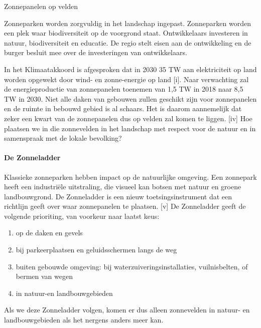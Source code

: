 \begin{voorstel}{Zonnepanelen op velden}


\begin{samenvatting}
Zonneparken worden zorgvuldig in het landschap ingepast. Zonneparken worden een plek waar biodiversiteit op de voorgrond staat. Ontwikkelaars investeren in natuur, biodiversiteit en educatie. De regio stelt eisen aan de ontwikkeling en de burger besluit mee over de investeringen van ontwikkelaars.
\end{samenvatting}

\begin{multicols}{2}

\begin{uitdaging}
In het Klimaatakkoord is afgesproken dat in 2030 35 TW aan elektriciteit op land worden opgewekt door wind- en zonne-energie op land [i]. Naar verwachting zal de energieproductie van zonnepanelen toenemen van 1,5 TW in 2018 naar 8,5 TW in 2030. Niet alle daken van gebouwen zullen geschikt zijn voor zonnepanelen en de ruimte in bebouwd gebied is al schaars. Het is daarom aannemelijk dat zeker een kwart van de zonnepanelen dus op velden zal komen te liggen. [iv] Hoe plaatsen we in die zonnevelden in het landschap met respect voor de natuur en in samenspraak met de lokale bevolking?
\end{uitdaging}

\begin{overwegingen}
\paragraph{De Zonneladder}
Klassieke zonneparken hebben impact op de natuurlijke omgeving. Een zonnepark heeft een industriële uitstraling, die visueel kan botsen met natuur en groene landbouwgrond. De Zonneladder is een nieuw toetsingsinstrument dat een richtlijn geeft over waar zonnepanelen te plaatsen. [v]
De Zonneladder geeft de volgende prioriting, van voorkeur naar laatst keus:
\begin{enumerate}
	\item op de daken en gevels
	\item bij parkeerplaatsen en geluidsschermen langs de weg
	\item buiten gebouwde omgeving: bij waterzuiveringsinstallaties, vuilnisbelten, of bermen van wegen
	\item in natuur-en landbouwgebieden
\end{enumerate}
Als we deze Zonneladder volgen, komen er dus alleen zonnevelden in natuur- en landbouwgebieden als het nergens anders meer kan.


\end{overwegingen}
\end{multicols}
\end{voorstel}
